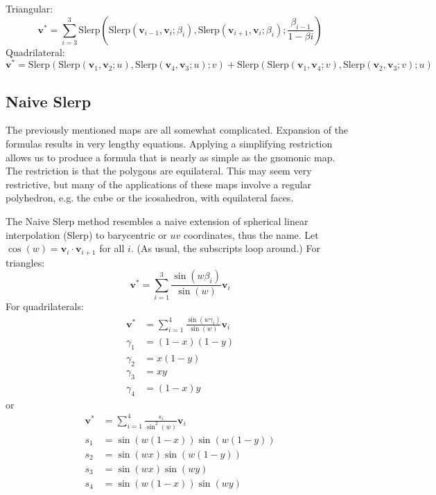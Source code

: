 \documentclass{amsart}[12pt]
\begin{document}
Triangular:
\begin{equation}\label{eq:nst}
\mathbf v^* = \sum^3_{i=3} \mathrm{Slerp}(
\mathrm{Slerp}(\mathbf v_{i-1}, \mathbf v_i; \beta_{i}),
\mathrm{Slerp}(\mathbf v_{i+1}, \mathbf v_i; \beta_{i});
\frac{\beta_{i-1}}{1-\beta{i}})
\end{equation}
Quadrilateral:%
\begin{equation}\label{eq:nsq}
\mathbf v^*
= \mathrm{Slerp}(
\mathrm{Slerp}(\mathbf v_1, \mathbf v_2; u),
\mathrm{Slerp}(\mathbf v_4, \mathbf v_3; u); v)
+ \mathrm{Slerp}(
\mathrm{Slerp}(\mathbf v_1, \mathbf v_4; v),
\mathrm{Slerp}(\mathbf v_2, \mathbf v_3; v); u)
\end{equation}

\subsection{Naive Slerp}
The previously mentioned maps are all somewhat complicated. Expansion of the
formulas results in very lengthy equations. Applying a simplifying restriction
allows us to produce a formula that is nearly as simple as the gnomonic map.
The restriction is that the polygons are equilateral. This may seem very
restrictive, but many of the applications of these maps involve a regular
polyhedron, e.g. the cube or the icosahedron, with equilateral faces.

The Naive Slerp method resembles a naive extension of spherical linear
interpolation (Slerp) to barycentric or $uv$ coordinates, thus the
name. Let $\cos(w) = \mathbf v_i \cdot \mathbf v_{i+1}$ for all $i$. (As
usual, the subscripts loop around.) For triangles:
\begin{equation}
   \mathbf v^* = \sum_{i=1}^3\frac{\sin(w\beta_i)}{\sin(w)}  \mathbf v_i
\end{equation}
For quadrilaterals:
\begin{equation}\begin{split}
     \mathbf v^* & = \sum_{i=1}^4\frac{\sin(w\gamma_i)}{\sin(w)} \mathbf v_i \\
\gamma_1 & = (1-x)(1-y) \\
\gamma_2 & = x(1-y) \\
\gamma_3 & = xy \\
\gamma_4 & = (1-x)y
\end{split}\end{equation}
or
\begin{equation}\begin{split}
   \mathbf v^* & = \sum_{i=1}^4\frac{s_i}{\sin^2(w)}  \mathbf v_i \\
s_1 &  = \sin (w(1-x))\sin (w(1-y)) \\
s_2 & = \sin (wx)\sin (w(1-y)) \\
s_3 & = \sin (wx)\sin (wy) \\
s_4 & = \sin (w(1-x))\sin (wy)
\end{split}\end{equation}
\end{document}
